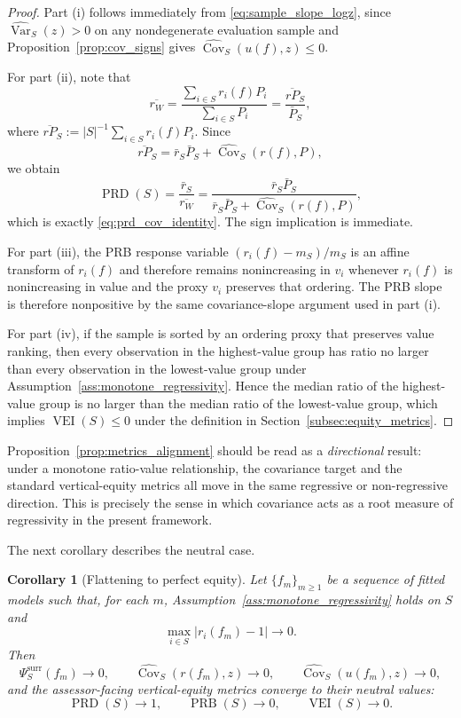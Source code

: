 \documentclass[12pt, draft]{article}
\newtheorem{corollary}{Corollary}
\theoremstyle{plain}
\theoremstyle{definition}
\newcommand{\1}{\mathbf{1}}
\begin{document}
\begin{proof}
Part (i) follows immediately from \eqref{eq:sample_slope_logz}, since $\widehat{\operatorname{Var}}_S(z)>0$ on any nondegenerate evaluation sample and Proposition~\ref{prop:cov_signs} gives $\widehat{\operatorname{Cov}}_S(u(f),z)\le 0$.

For part (ii), note that
\[
\overline{r_W}
=
\frac{\sum_{i\in S} r_i(f)P_i}{\sum_{i\in S} P_i}
=
\frac{\overline{rP}_S}{\bar P_S},
\]
where $\overline{rP}_S:=|S|^{-1}\sum_{i\in S} r_i(f)P_i$. Since
\[
\overline{rP}_S
=
\bar r_S\bar P_S
+
\widehat{\operatorname{Cov}}_S(r(f),P),
\]
we obtain
\[
\operatorname{PRD}(S)
=
\frac{\bar r_S}{\overline{r_W}}
=
\frac{\bar r_S\bar P_S}
{\bar r_S\bar P_S+\widehat{\operatorname{Cov}}_S(r(f),P)},
\]
which is exactly \eqref{eq:prd_cov_identity}. The sign implication is immediate.

For part (iii), the PRB response variable $(r_i(f)-m_S)/m_S$ is an affine transform of $r_i(f)$ and therefore remains nonincreasing in $v_i$ whenever $r_i(f)$ is nonincreasing in value and the proxy $v_i$ preserves that ordering. The PRB slope is therefore nonpositive by the same covariance-slope argument used in part (i).

For part (iv), if the sample is sorted by an ordering proxy that preserves value ranking, then every observation in the highest-value group has ratio no larger than every observation in the lowest-value group under Assumption~\ref{ass:monotone_regressivity}. Hence the median ratio of the highest-value group is no larger than the median ratio of the lowest-value group, which implies $\operatorname{VEI}(S)\le 0$ under the definition in Section~\ref{subsec:equity_metrics}.
\end{proof}

Proposition~\ref{prop:metrics_alignment} should be read as a \emph{directional} result: under a monotone ratio-value relationship, the covariance target and the standard vertical-equity metrics all move in the same regressive or non-regressive direction. This is precisely the sense in which covariance acts as a root measure of regressivity in the present framework.

The next corollary describes the neutral case.

\begin{corollary}[Flattening to perfect equity]
\label{cor:neutralization}
Let $\{f_m\}_{m\ge 1}$ be a sequence of fitted models such that, for each $m$, Assumption~\ref{ass:monotone_regressivity} holds on $S$ and
\[
\max_{i\in S}|r_i(f_m)-1|\to 0.
\]
Then
\[
\Psi_S^{\mathrm{surr}}(f_m)\to 0,
\qquad
\widehat{\operatorname{Cov}}_S(r(f_m),z)\to 0,
\qquad
\widehat{\operatorname{Cov}}_S(u(f_m),z)\to 0,
\]
and the assessor-facing vertical-equity metrics converge to their neutral values:
\[
\operatorname{PRD}(S)\to 1,
\qquad
\operatorname{PRB}(S)\to 0,
\qquad
\operatorname{VEI}(S)\to 0.
\]
\end{corollary}
\end{document}
